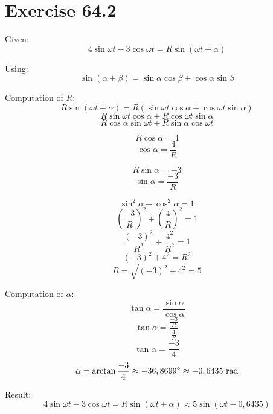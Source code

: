 \documentclass[a4paper, 10pt]{scrartcl}
\begin{document}
\section{Exercise 64.2}

Given:
\[4\sin{\omega t} - 3\cos{\omega t} = R\sin{(\omega t + \alpha)}\]

Using:
\[\sin{(\alpha + \beta)} = \sin{\alpha}\cos{\beta} + \cos{\alpha}\sin{\beta}\]

Computation of $R$:
\[R\sin{(\omega t + \alpha)} =
R(\sin{\omega t}\cos{\alpha} + \cos{\omega t}\sin{\alpha})\]
\[R\sin{\omega t}\cos{\alpha} + R\cos{\omega t}\sin{\alpha}\]
\[R\cos{\alpha}\sin{\omega t} + R\sin{\alpha}\cos{\omega t}\]

\[R\cos{\alpha} = 4\]
\[\cos{\alpha} = \frac{4}{R}\]

\[R\sin{\alpha} = -3\]
\[\sin{\alpha} = \frac{-3}{R}\]

\[\sin^{2}{\alpha} + \cos^{2}{\alpha} = 1\]
\[\left(\frac{-3}{R}\right)^{2} + \left(\frac{4}{R}\right)^{2} = 1\]
\[\frac{(-3)^{2}}{R^{2}} + \frac{4^{2}}{R^{2}} = 1\]
\[(-3)^{2} + 4^{2} = R^{2}\]
\[R = \sqrt{(-3)^{2} + 4^{2}} = 5\]

Computation of $\alpha$:
\[\tan{\alpha} = \frac{\sin{\alpha}}{\cos{\alpha}}\]
\[\tan{\alpha} = \frac{\frac{-3}{R}}{\frac{4}{R}}\]
\[\tan{\alpha} = \frac{-3}{4}\]
\[\alpha = \arctan{\frac{-3}{4}} \approx -36,8699^\circ \approx -0,6435\textnormal{ rad}\]

Result:
\[4\sin{\omega t} - 3\cos{\omega t} = R\sin{(\omega t + \alpha)} \approx
5\sin{(\omega t - 0,6435)}\]
\end{document}
